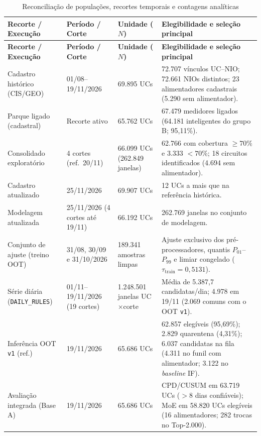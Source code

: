 \begingroup\footnotesize
\setlength{\tabcolsep}{3pt}\begin{longtable}{@{}p{.21\linewidth}p{.16\linewidth}p{.17\linewidth}p{}@{}}
\caption{Reconciliação de populações, recortes temporais e contagens analíticas}\label{tab:reconciliacao_populacoes} \\
\hline
\textbf{Recorte / Execução} & \textbf{Período / Corte} & \textbf{Unidade ($N$)} & \textbf{Elegibilidade e seleção principal} \\
\hline\endfirsthead
\hline
\textbf{Recorte / Execução} & \textbf{Período / Corte} & \textbf{Unidade ($N$)} & \textbf{Elegibilidade e seleção principal} \\
\hline\endhead
Cadastro histórico (CIS/GEO) & 01/08--19/11/2026 & 69.895 UCs & 72.707 vínculos UC--NIO; 72.661 NIOs distintos; 23 alimentadores cadastrais (5.290 sem alimentador). \\
Parque ligado (cadastral) & Recorte ativo & 65.762 UCs & 67.479 medidores ligados (64.181 inteligentes do grupo B; 95,11\%). \\
Consolidado exploratório & 4 cortes (ref.\ 20/11) & 66.099 UCs (262.849 janelas) & 62.766 com cobertura $\ge 70\%$ e 3.333 $< 70\%$; 18 circuitos identificados (4.694 sem alimentador). \\
Cadastro atualizado & 25/11/2026 & 69.907 UCs & 12 UCs a mais que na referência histórica. \\
Modelagem atualizada & 25/11/2026 (4 cortes até 19/11) & 66.192 UCs & 262.769 janelas no conjunto de modelagem. \\
Conjunto de ajuste (treino OOT) & 31/08, 30/09 e 31/10/2026 & 189.341 amostras limpas & Ajuste exclusivo dos pré-processadores, quantis $P_{01}$--$P_{99}$ e limiar congelado ($\tau_{\text{train}} = 0{,}5131$). \\
Série diária (\texttt{DAILY\_RULES}) & 01/11--19/11/2026 (19 cortes) & 1.248.501 janelas UC$\times$corte & Média de 5.387,7 candidatas/dia; 4.978 em 19/11 (2.069 comuns com o OOT \texttt{v1}). \\
Inferência OOT \texttt{v1} (ref.) & 19/11/2026 & 65.686 UCs & 62.857 elegíveis (95,69\%); 2.829 quarentena (4,31\%); 6.037 candidatas na fila (4.311 no funil com alimentador; 3.122 no \emph{baseline} IF). \\
Avaliação integrada (Base A) & 19/11/2026 & 65.686 UCs & CPD/CUSUM em 63.719 UCs ($>8$ dias confiáveis); MoE em 58.820 UCs elegíveis (16 alimentadores; 282 trocas no Top-2.000). \\

\end{longtable}

